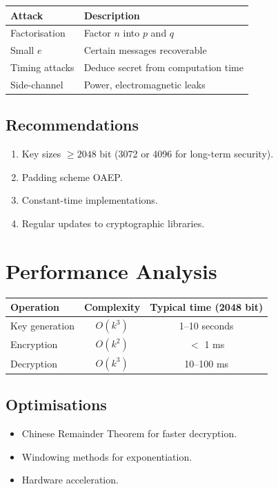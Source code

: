 \begin{center}
\begin{tabular}{ll}
\toprule
Attack & Description \\
\midrule
Factorisation & Factor $n$ into $p$ and $q$ \\
Small $e$ & Certain messages recoverable \\
Timing attacks & Deduce secret from computation time \\
Side-channel & Power, electromagnetic leaks \\
\bottomrule
\end{tabular}
\end{center}

\subsection{Recommendations}

\begin{enumerate}
  \item Key sizes $\ge 2048$ bit (3072 or 4096 for long-term security).
  \item Padding scheme OAEP.
  \item Constant-time implementations.
  \item Regular updates to cryptographic libraries.
\end{enumerate}

\section{Performance Analysis}

\begin{center}
\begin{tabular}{lcc}
\toprule
Operation & Complexity & Typical time (2048 bit) \\
\midrule
Key generation & $O(k^3)$ & 1--10 seconds \\
Encryption & $O(k^2)$ & $<$ 1 ms \\
Decryption & $O(k^3)$ & 10--100 ms \\
\bottomrule
\end{tabular}
\end{center}

\subsection{Optimisations}

\begin{itemize}
  \item Chinese Remainder Theorem for faster decryption.
  \item Windowing methods for exponentiation.
  \item Hardware acceleration.
\end{itemize}

